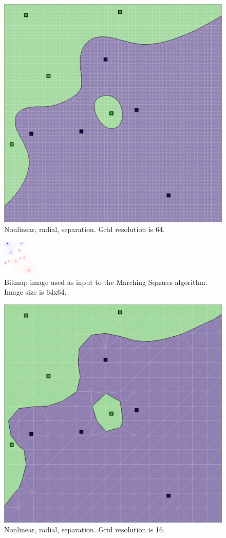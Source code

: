 \documentclass[12pt]{article}
\begin{document}
\begin{figure} 
\centering
  \includegraphics[width = 3 in]{64_res.png}
  \caption{Nonlinear, radial, separation. Grid resolution is 64.
}
\end{figure}

\begin{figure} 
\centering
  \includegraphics[width = 3 in]{64_res_image.png}
  \caption{Bitmap image used as input to the Marching Squares algorithm. 
Image size is 64x64.
}
\end{figure}

\begin{figure} 
\centering
  \includegraphics[width = 3 in]{16_res.png}
  \caption{Nonlinear, radial, separation. Grid resolution is 16.
}
\end{figure}
\end{document}
